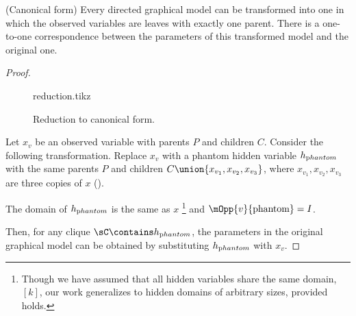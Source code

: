 \begin{lemma}(Canonical form) 
  \label{lem:reduction}
Every directed graphical model can be transformed into one in which
  the observed variables are leaves with exactly one parent. 
There is a one-to-one correspondence between the parameters of this
  transformed model and the original one.
\end{lemma}
\begin{proof}
  \begin{figure}
    \label{fig:reduction}
    \centering
    {reduction.tikz}
    \caption{Reduction to canonical form.}
  \end{figure}

  \providecommand{\hp}{\ensuremath{h_{\textrm phantom}}}

  Let $x_v$ be an observed variable with parents $P$ and children $C$.
  Consider the following transformation.
  Replace $x_v$ with a phantom hidden variable \hp with the same
  parents $P$ and children $C \union \{x_{v_1}, x_{v_2}, x_{v_3}\}$,
  where $x_{v_1},x_{v_2},x_{v_3}$ are three copies of $x$
  (). 
  
  The domain of $\hp$ is the same as $x$
    \footnote{Though we have assumed that all hidden variables share the
      same domain, $[k]$, our work generalizes to hidden domains of
      arbitrary sizes, provided  holds.}
    and $\mOpp{v}{\textrm{phantom}} = I$.

  Then, for any clique $\sC \contains \hp$, the parameters in the
    original graphical model can be obtained by substituting $\hp$ with
    $x_v$.
\end{proof}

